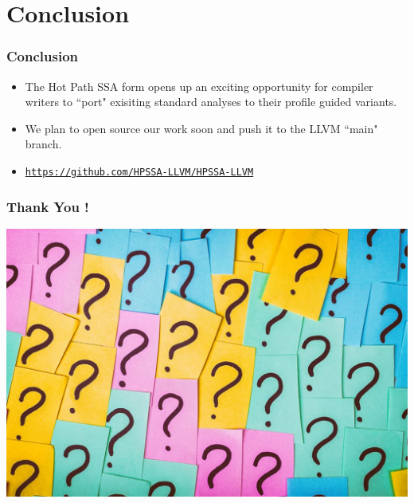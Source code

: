 \documentclass[aspectratio=169, compress]{beamer}
\begin{document}
\section{Conclusion}
\begin{frame}
	\frametitle{Conclusion}
	\begin{itemize}
		\item The Hot Path SSA form opens up an exciting opportunity for compiler writers to ``port" exisiting standard analyses to their profile guided variants. \pause
		\item We plan to open source our work soon and push it to the LLVM ``main" branch.
		\pause
		\item \large{\color{blue}\href{https://github.com/HPSSA-LLVM/HPSSA-LLVM}{
				\texttt{https://github.com/HPSSA-LLVM/HPSSA-LLVM}}\color{black}}
	\end{itemize}
\end{frame}
\begin{frame}
	\frametitle{\quad\quad\quad\quad\quad\quad\quad\quad\quad\quad\quad\quad Thank You !}
	\centering
	\includegraphics[width=0.9\columnwidth,height=0.9\textheight]{dotfiles/questions.pdf}
\end{frame}
\end{document}

